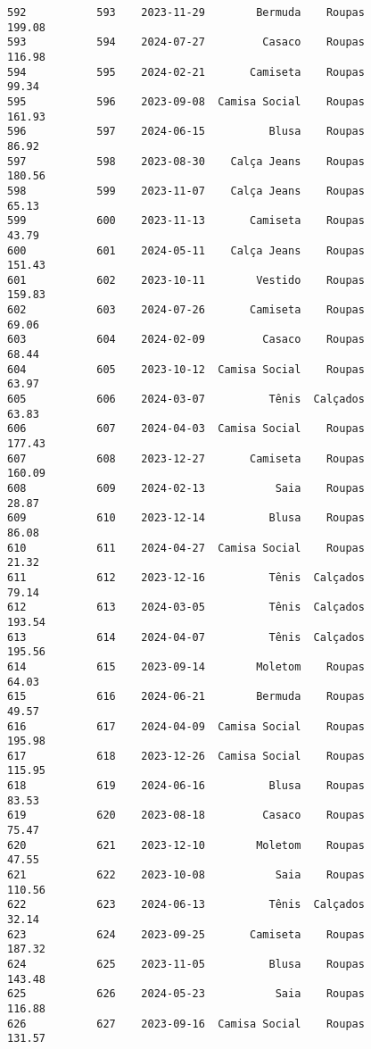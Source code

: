 \documentclass[11pt]{article}
\begin{document}
\begin{Verbatim}[commandchars=\\\{\}]
592           593    2023-11-29        Bermuda    Roupas          199.08   
593           594    2024-07-27         Casaco    Roupas          116.98   
594           595    2024-02-21       Camiseta    Roupas           99.34   
595           596    2023-09-08  Camisa Social    Roupas          161.93   
596           597    2024-06-15          Blusa    Roupas           86.92   
597           598    2023-08-30    Calça Jeans    Roupas          180.56   
598           599    2023-11-07    Calça Jeans    Roupas           65.13   
599           600    2023-11-13       Camiseta    Roupas           43.79   
600           601    2024-05-11    Calça Jeans    Roupas          151.43   
601           602    2023-10-11        Vestido    Roupas          159.83   
602           603    2024-07-26       Camiseta    Roupas           69.06   
603           604    2024-02-09         Casaco    Roupas           68.44   
604           605    2023-10-12  Camisa Social    Roupas           63.97   
605           606    2024-03-07          Tênis  Calçados           63.83   
606           607    2024-04-03  Camisa Social    Roupas          177.43   
607           608    2023-12-27       Camiseta    Roupas          160.09   
608           609    2024-02-13           Saia    Roupas           28.87   
609           610    2023-12-14          Blusa    Roupas           86.08   
610           611    2024-04-27  Camisa Social    Roupas           21.32   
611           612    2023-12-16          Tênis  Calçados           79.14   
612           613    2024-03-05          Tênis  Calçados          193.54   
613           614    2024-04-07          Tênis  Calçados          195.56   
614           615    2023-09-14        Moletom    Roupas           64.03   
615           616    2024-06-21        Bermuda    Roupas           49.57   
616           617    2024-04-09  Camisa Social    Roupas          195.98   
617           618    2023-12-26  Camisa Social    Roupas          115.95   
618           619    2024-06-16          Blusa    Roupas           83.53   
619           620    2023-08-18         Casaco    Roupas           75.47   
620           621    2023-12-10        Moletom    Roupas           47.55   
621           622    2023-10-08           Saia    Roupas          110.56   
622           623    2024-06-13          Tênis  Calçados           32.14   
623           624    2023-09-25       Camiseta    Roupas          187.32   
624           625    2023-11-05          Blusa    Roupas          143.48   
625           626    2024-05-23           Saia    Roupas          116.88   
626           627    2023-09-16  Camisa Social    Roupas          131.57   

\end{Verbatim}
\end{document}
